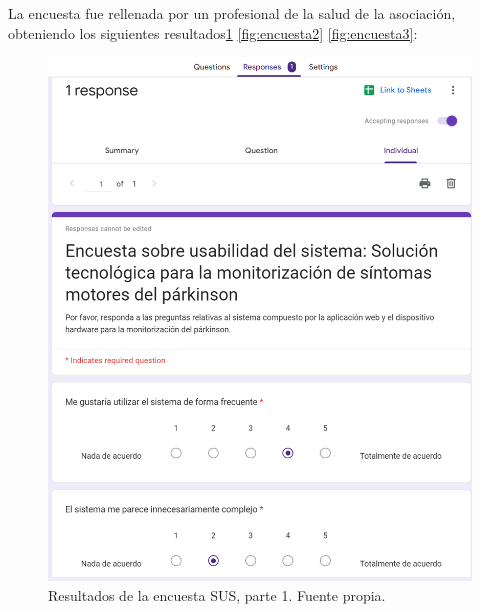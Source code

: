 La encuesta fue rellenada por un profesional de la salud de la asociación, obteniendo los siguientes resultados\ref{fig:encuesta1} \ref{fig:encuesta2} \ref{fig:encuesta3}:
    \begin{figure}[h]
        \centering
        \includegraphics[width=1\textwidth]{img/encuesta1.png}
        \caption{Resultados de la encuesta SUS, parte 1. Fuente propia.}
        \label{fig:encuesta1}
    \end{figure}
